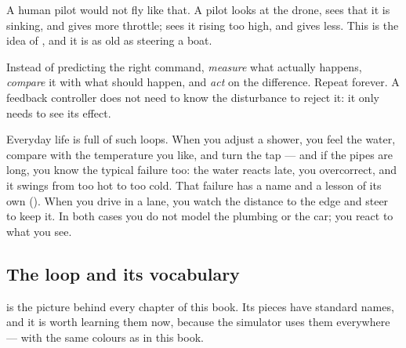 A human pilot would not fly like that. A pilot looks at the drone, sees that it is sinking, and gives more throttle; sees it rising too high, and gives less. This is the idea of , and it is as old as steering a boat.

\begin{keyidea}[Feedback]
Instead of predicting the right command, \emph{measure} what actually happens, \emph{compare} it with what should happen, and \emph{act} on the difference. Repeat forever. A feedback controller does not need to know the disturbance to reject it: it only needs to see its effect.
\end{keyidea}

Everyday life is full of such loops. When you adjust a shower, you feel the water, compare with the temperature you like, and turn the tap — and if the pipes are long, you know the typical failure too: the water reacts late, you overcorrect, and it swings from too hot to too cold. That failure has a name and a lesson of its own (). When you drive in a lane, you watch the distance to the edge and steer to keep it. In both cases you do not model the plumbing or the car; you react to what you see.

\subsection{The loop and its vocabulary}

 is the picture behind every chapter of this book. Its pieces have standard names, and it is worth learning them now, because the simulator uses them everywhere — with the same colours as in this book.


